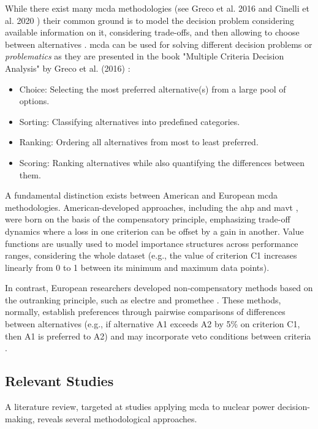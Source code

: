While there exist many \gls{mcda} methodologies (see Greco et al. 2016 \cite{Köksalan2016} and Cinelli et al. 2020 \cite{CINELLI2020102261}) their common ground is to model the decision problem considering available information on it, considering trade-offs, and then allowing to choose between alternatives \cite{HAAG2022105361}. \gls{mcda} can be used for solving different decision problems or \textit{problematics} as they are presented in the book "Multiple Criteria Decision Analysis" by Greco et al. (2016) \cite{Greco_Ehrgott_Figueira_2016}:
\begin{itemize}
\item Choice: Selecting the most preferred alternative(s) from a large pool of options.
\item Sorting: Classifying alternatives into predefined categories.
\item Ranking: Ordering all alternatives from most to least preferred.
\item Scoring: Ranking alternatives while also quantifying the differences between them.
\end{itemize}

A fundamental distinction exists between American and European \gls{mcda} methodologies. American-developed approaches, including the \gls{ahp} \cite{SAATY1987161} and \gls{mavt} \cite{KEENEY1996537, keeney1993decisions}, were born on the basis of the compensatory principle, emphasizing trade-off dynamics where a loss in one criterion can be offset by a gain in another. Value functions are usually used to model importance structures across performance ranges, considering the whole dataset (e.g., the value of criterion C1 increases linearly from 0 to 1 between its minimum and maximum data points).

In contrast, European researchers developed non-compensatory methods based on the outranking principle, such as \acrshort{electre} \cite{Roy199149} and \acrshort{promethee} \cite{Brans_Vincke_1985}. These methods, normally, establish preferences through pairwise comparisons of differences between alternatives (e.g., if alternative A1 exceeds A2 by 5\% on criterion C1, then A1 is preferred to A2) and may incorporate veto conditions between criteria \cite{Greco_Ehrgott_Figueira_2016, HUANG2026103438, Köksalan2016}.

\subsection{Relevant Studies}
\label{sec:relevant_studies}
A literature review, targeted at studies applying \gls{mcda} to nuclear power decision-making, reveals several methodological approaches.

